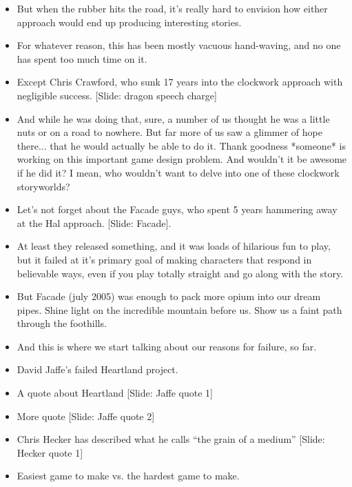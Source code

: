 \documentclass[12pt]{article}
\begin{document}
{\begin{itemize}
\item But when the rubber hits the road, it's really hard to envision how either approach would end up producing interesting stories.

\item For whatever reason, this has been mostly vacuous hand-waving, and no one has spent too much time on it.  

\item Except Chris Crawford, who sunk 17 years into the clockwork approach with negligible success. [Slide: dragon speech charge]

\item And while he was doing that, sure, a number of us thought he was a little nuts or on a road to nowhere.  But far more of us saw a glimmer of hope there... that he would actually be able to do it. Thank goodness *someone* is working on this important game design problem. And wouldn't it be awesome if he did it?  I mean, who wouldn't want to delve into one of these clockwork storyworlds?

\item Let's not forget about the Facade guys, who spent 5 years hammering away at the Hal approach. [Slide: Facade].


\item At least they released something, and it was loads of hilarious fun to play, but it failed at it's primary goal of making characters that respond in believable ways, even if you play totally straight and go along with the story.


\item But Facade (july 2005) was enough to pack more opium into our dream pipes.  Shine light on the incredible mountain before us.  Show us a faint path through the foothills.


\item And this is where we start talking about our reasons for failure, so far.

\item David Jaffe's failed Heartland project.

\item A quote about Heartland [Slide: Jaffe quote 1]

\item More quote [Slide: Jaffe quote 2]

\item Chris Hecker has described what he calls ``the grain of a medium'' [Slide: Hecker quote 1]

\item Easiest game to make vs. the hardest game to make.


\end{itemize}}
\end{document}
